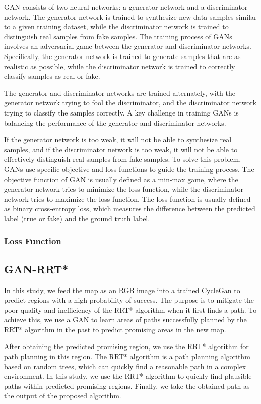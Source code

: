 \documentclass[smallcondensed]{svjour3}     %
\begin{document}
GAN consists of two neural networks: a generator network and a discriminator network. 
The generator network is trained to synthesize new data samples similar to a given training dataset, while the discriminator network is trained to distinguish real samples from fake samples.
The training process of GANs involves an adversarial game between the generator and discriminator networks. 
Specifically, the generator network is trained to generate samples that are as realistic as possible, while the discriminator network is trained to correctly classify samples as real or fake. 

The generator and discriminator networks are trained alternately, with the generator network trying to fool the discriminator, and the discriminator network trying to classify the samples correctly.
A key challenge in training GANs is balancing the performance of the generator and discriminator networks. 

If the generator network is too weak, it will not be able to synthesize real samples, and if the discriminator network is too weak, it will not be able to effectively distinguish real samples from fake samples. 
To solve this problem, GANs use specific objective and loss functions to guide the training process.
The objective function of GAN is usually defined as a min-max game, where the generator network tries to minimize the loss function, while the discriminator network tries to maximize the loss function.
The loss function is usually defined as binary cross-entropy loss, which measures the difference between the predicted label (true or fake) and the ground truth label.

\subsubsection{Loss Function}


\subsection{GAN-RRT*}
In this study, we feed the map as an RGB image into a trained CycleGan to predict regions with a high probability of success. 
The purpose is to mitigate the poor quality and inefficiency of the RRT* algorithm when it first finds a path. 
To achieve this, we use a GAN to learn areas of paths successfully planned by the RRT* algorithm in the past to predict promising areas in the new map.

After obtaining the predicted promising region, we use the RRT* algorithm for path planning in this region.
The RRT* algorithm is a path planning algorithm based on random trees, which can quickly find a reasonable path in a complex environment. 
In this study, we use the RRT* algorithm to quickly find plausible paths within predicted promising regions. 
Finally, we take the obtained path as the output of the proposed algorithm.
\end{document}
